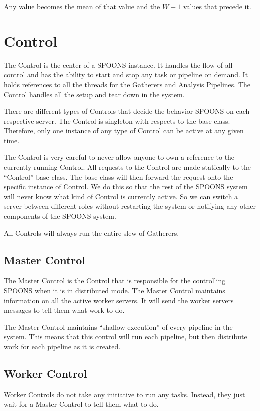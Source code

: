 \documentclass[12pt]{ucthesis}
\begin{document}
Any value becomes the mean of that value and the $W - 1$ values that precede it.

\section{Control}
\label{arch-control}
The Control is the center of a SPOONS instance. It handles the flow of all control and has the ability to start and
stop any task or pipeline on demand. It holds references to all the threads for the Gatherers and Analysis Pipelines.
The Control handles all the setup and tear down in the system.

There are different types of Controls that decide the behavior SPOONS on each respective server.
The Control is singleton with respects to the base class. Therefore, only one instance of any type of Control can be
active at any given time.

The Control is very careful to never allow anyone to own a reference to the currently running Control.
All requests to the Control are made statically to the ``Control'' base class. The base class will then forward the
request onto the specific instance of Control. We do this so that the rest of the SPOONS system will never know
what kind of Control is currently active. So we can switch a server between different roles without restarting the
system or notifying any other components of the SPOONS system.

All Controls will always run the entire slew of Gatherers.

\subsection{Master Control}
\label{arch-master-control}
The Master Control is the Control that is responsible for the controlling SPOONS when it is in distributed mode.
The Master Control maintains information on all the active worker servers. It will send the worker servers
messages to tell them what work to do.

The Master Control maintains ``shallow execution'' of every pipeline in the system.
This means that this control will run each pipeline, but then distribute work for each pipeline as it is created.

\subsection{Worker Control}
\label{arch-worker-control}
Worker Controls do not take any initiative to run any tasks. Instead, they just wait for a Master Control to tell them what to do.
\end{document}
